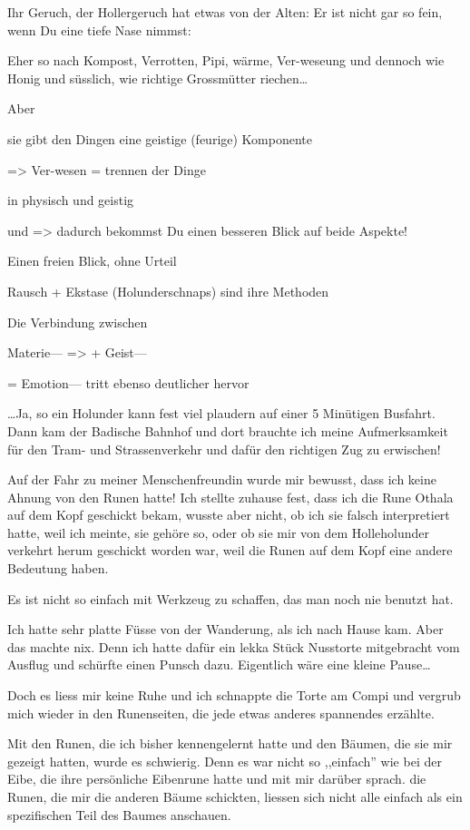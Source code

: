 \documentclass[11pt,titlepage,a5paper]{book}
\begin{document}
Ihr Geruch, der Hollergeruch hat etwas von der Alten: Er ist nicht gar so fein, wenn Du eine  tiefe Nase nimmst:

Eher so nach Kompost, Verrotten, Pipi, wärme, Ver-weseung und dennoch wie Honig und süsslich, wie richtige Grossmütter riechen\dots

Aber

sie gibt den Dingen eine geistige (feurige) Komponente

=> Ver-wesen = trennen der Dinge

in physisch und geistig

und => dadurch bekommst Du einen besseren Blick auf beide Aspekte!

Einen freien Blick, ohne Urteil

Rausch + Ekstase (Holunderschnaps) sind ihre Methoden

Die Verbindung zwischen

Materie--- => + Geist--- 
	
= Emotion--- tritt ebenso deutlicher hervor

\dots Ja, so ein Holunder kann fest viel plaudern auf einer 5 Minütigen Busfahrt. Dann kam der Badische Bahnhof und dort brauchte ich meine Aufmerksamkeit für den Tram- und Strassenverkehr und dafür den richtigen Zug zu erwischen!

Auf der Fahr zu meiner Menschenfreundin wurde mir bewusst, dass ich keine Ahnung von den Runen hatte! Ich stellte zuhause fest, dass ich die Rune Othala auf dem Kopf geschickt bekam, wusste aber nicht, ob ich sie falsch interpretiert hatte, weil ich meinte, sie gehöre so, oder ob sie mir von dem Holleholunder verkehrt herum geschickt worden war, weil die Runen auf dem Kopf eine andere Bedeutung haben.

Es ist nicht so einfach mit Werkzeug zu schaffen, das man noch nie benutzt hat.

Ich hatte sehr platte Füsse von der Wanderung, als ich nach Hause kam. Aber das machte nix. Denn ich hatte dafür ein lekka Stück Nusstorte mitgebracht vom Ausflug und schürfte einen Punsch dazu. Eigentlich wäre eine kleine Pause\dots

Doch es liess mir keine Ruhe und ich schnappte die Torte am Compi und vergrub mich wieder in den Runenseiten, die jede etwas anderes spannendes erzählte.

Mit den Runen, die ich bisher kennengelernt hatte und den Bäumen, die sie mir gezeigt hatten, wurde es schwierig. Denn es war nicht so ,,einfach'' wie bei der Eibe, die ihre  persönliche Eibenrune hatte und mit mir darüber sprach. die Runen, die mir die anderen Bäume schickten, liessen sich nicht alle einfach als ein spezifischen Teil des Baumes anschauen. 
\end{document}
